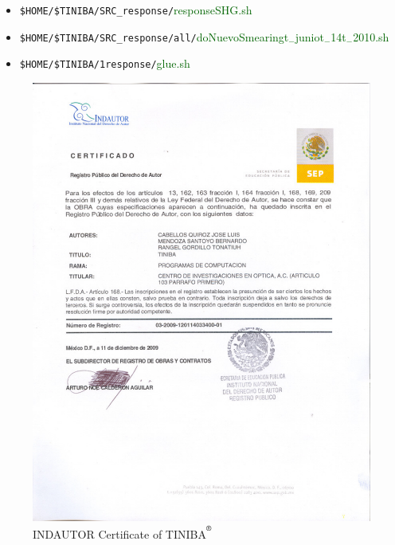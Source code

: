 \documentclass[12pt]{article}
\numberwithin{equation}{section}
\begin{document}
\begin{enumerate}
   
\begin{itemize}
\item \verb=$HOME/$TINIBA/SRC_response/=\textcolor{darkgreen}{responseSHG.sh} 
\item \verb=$HOME/$TINIBA/SRC_response/all/=\textcolor{darkgreen}{doNuevoSmearingt$_{-}$juniot$_{-}$14t$_{-}$2010.sh} 
\item \verb=$HOME/$TINIBA/1response/=\textcolor{darkgreen}{glue.sh} 
\end{itemize}

\end{enumerate}

\begin{figure}[t]
\begin{center}
\includegraphics[scale=0.6]{CERTIFICADO-INDAUTOR-TINIBA1}
\end{center}
\caption{INDAUTOR Certificate of TINIBA$^{\reg}$ 
}
\label{inpi}
\end{figure}


{}
\end{document}
